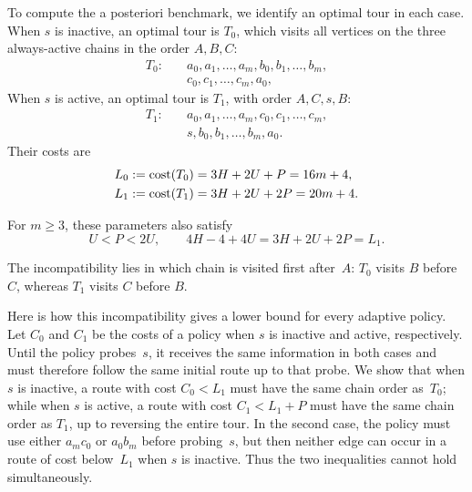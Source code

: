 \documentclass[12pt,a4paper,oneside]{report}
\begin{document}
To compute the a posteriori benchmark, we identify an optimal tour in each
case.  When $s$ is inactive, an optimal tour is $T_0$, which visits all
vertices on the three always-active chains in the order $A,B,C$:
\begin{equation}\label{eq:T0}
\begin{split}
  T_0:\quad
  &a_0,a_1,\ldots,a_m,
  b_0,b_1,\ldots,b_m,\\
  &c_0,c_1,\ldots,c_m,a_0,
\end{split}
\end{equation}
When $s$ is active, an optimal tour is $T_1$, with order $A,C,s,B$:
\begin{equation}\label{eq:T1}
\begin{split}
  T_1:\quad
  &a_0,a_1,\ldots,a_m,
  c_0,c_1,\ldots,c_m,\\
  &s,b_0,b_1,\ldots,b_m,a_0.
\end{split}
\end{equation}
Their costs are
\begin{align}
  L_0&:=\operatorname{cost}(T_0)=3H+2U+P=16m+4,
  \label{eq:L0}\\
  L_1&:=\operatorname{cost}(T_1)=3H+2U+2P=20m+4.
  \label{eq:L1}
\end{align}

For $m\ge3$, these parameters also satisfy
\begin{equation}\label{eq:three-chain-parameter-relations}
  U<P<2U,
  \qquad
  4H-4+4U=3H+2U+2P=L_1.
\end{equation}

The incompatibility lies in which chain is visited first after~$A$:
$T_0$ visits $B$ before $C$, whereas $T_1$ visits $C$ before $B$.

Here is how this incompatibility gives a lower bound for every adaptive
policy.  Let $C_0$ and $C_1$ be the costs of a policy when $s$ is inactive
and active, respectively.  Until the policy probes~$s$, it receives the same information
in both cases and must therefore follow the same initial route up to that
probe.  We show that when $s$ is inactive, a route with cost $C_0<L_1$ must have the same chain order
as~$T_0$; while when $s$ is active, a route with cost $C_1<L_1+P$ must have the same chain order as
$T_1$, up to reversing the entire tour.  In the second
case, the policy must use either $a_mc_0$ or $a_0b_m$ before probing~$s$, but then neither edge can occur in a route of cost below~$L_1$ when $s$ is inactive.
Thus the two inequalities cannot hold simultaneously.
\end{document}
